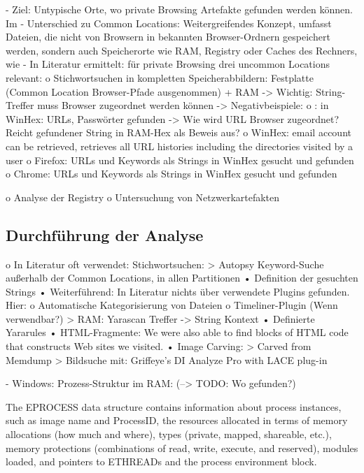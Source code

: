 -	Ziel: Untypische Orte, wo private Browsing Artefakte gefunden werden können. Im
-	Unterschied zu Common Locations: Weitergreifendes Konzept, umfasst Dateien, die nicht von Browsern in bekannten Browser-Ordnern gespeichert werden, sondern auch Speicherorte wie RAM, Registry oder Caches des Rechners, wie 
-	In Literatur ermittelt: für private Browsing drei uncommon Locations relevant:
	o	Stichwortsuchen in kompletten Speicherabbildern: Festplatte (Common Location Browser-Pfade ausgenommen) + RAM 
		-> Wichtig: String-Treffer muss Browser zugeordnet werden können
		-> Negativbeispiele:
			o \cite{Rochmadi.2017}: in WinHex: URLs, Passwörter gefunden -> Wie wird URL Browser zugeordnet? Reicht gefundener String in RAM-Hex als Beweis aus?
			o \cite{Md.2018} WinHex: email account can be retrieved, retrieves all URL histories including the directories visited by a user
			o \cite{Montasari.2015}	Firefox: URLs und Keywords als Strings in WinHex gesucht und gefunden 
			o \cite{Montasari.2015}	Chrome: URLs und Keywords als Strings in WinHex gesucht und gefunden
			
			
	o	Analyse der Registry
	o	Untersuchung von Netzwerkartefakten


\subsection*{Durchführung der Analyse}
o	In Literatur oft verwendet: Stichwortsuchen:
>	Autopsy Keyword-Suche außerhalb der Common Locations, in allen Partitionen
	•	Definition der gesuchten Strings
	•	Weiterführend:  In Literatur nichts über verwendete Plugins gefunden. Hier:
		o	Automatische Kategorisierung von Dateien
		o	Timeliner-Plugin (Wenn verwendbar?)
>	RAM: Yarascan Treffer -> String Kontext
	•	Definierte Yararules
	•	HTML-Fragmente: \cite{Said.2011} We were also able to find blocks of HTML code that constructs Web sites we visited.
	•	Image Carving: 
		> Carved from Memdump \cite{Ohana.2013}
		>  Bildsuche mit: Griffeye’s DI Analyze Pro with LACE plug-in \cite{Horsman.2019}
	
	- Windows: Prozess-Struktur im RAM: 
		(--> TODO: Wo gefunden?)
		
		The EPROCESS data structure contains information about process instances, such as image name and ProcessID, the resources allocated in terms of memory allocations (how much and where), types (private, mapped, shareable, etc.), memory protections (combinations of read, write, execute, and reserved), modules loaded, and pointers to ETHREADs and the process environment block.
		
